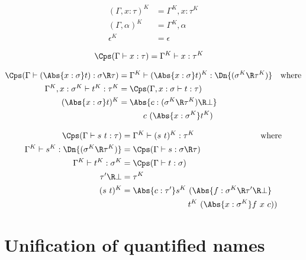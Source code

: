 \documentclass{amsart}
\begin{document}
\begin{align*}
(\Gamma, x:\tau)^K & =
  \Gamma^K, x:\tau^K
  \\
(\Gamma, \alpha)^K & =
  \Gamma^K, \alpha
  \\
\epsilon^K & =
  \epsilon
\end{align*}

\begin{align*}
\Cps(\Gamma \vdash x : \tau) & =
  \Gamma^K \vdash x : \tau^K
\end{align*}

\begin{align*}
\Cps(\Gamma \vdash (\Abs{x:\sigma}t) : \sigma \R \tau) & =
  \Gamma^K \vdash (\Abs{x:\sigma}t)^K : \Dn{(\sigma^K \R \tau^K)} &
  \mbox{where}
  \\
\Gamma^K,x:\sigma^K \vdash t^K : \tau^K & =
  \Cps(\Gamma,x:\sigma \vdash t : \tau)
  \\
(\Abs{x:\sigma}t)^K & =
  \Abs{c : (\sigma^K \R \tau^K) \R \bot} \\
  &\hspace{3em} c~(\Abs{x : \sigma^K} t^K)
\end{align*}

\begin{align*}
\Cps(\Gamma \vdash s~t : \tau) & =
  \Gamma^K \vdash (s~t)^K : \tau^K
  \hspace{8em} \mbox{where}
  \\
\Gamma^K \vdash s^K : \Dn{(\sigma^K \R \tau^K)} & =
  \Cps(\Gamma \vdash s : \sigma \R \tau)
  \\
\Gamma^K \vdash t^K : \sigma^K & =
  \Cps(\Gamma \vdash t : \sigma)
  \\
\tau' \R \bot & = \tau^K
  \\
(s~t)^K & =
  \Abs{c : \tau'} s^K~(\Abs{f : \sigma^K \R \tau' \R \bot} \\
  &\hspace{8em} t^K~(\Abs{x : \sigma^K} f~x~c))
\end{align*}


\section{Unification of quantified names}
\label{sec:unify}
\end{document}
